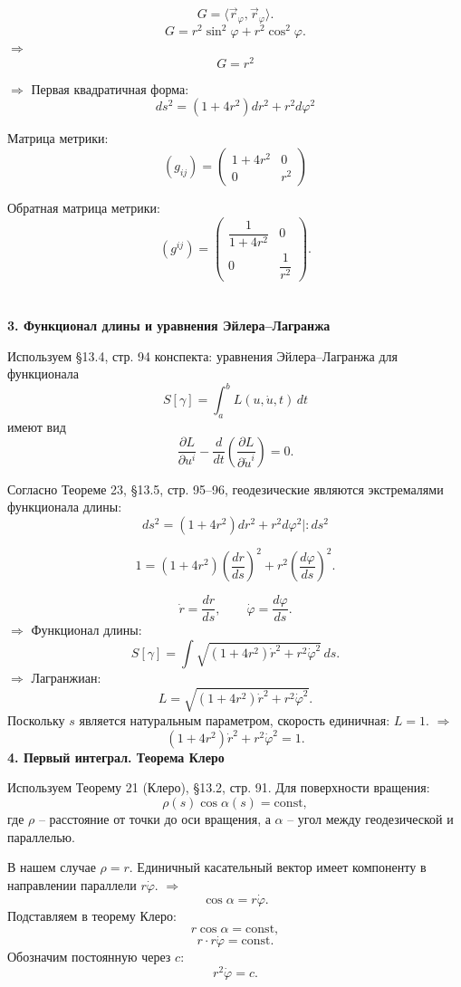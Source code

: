 \documentclass[12pt,a4paper]{article}
\begin{document}
\[
G=\langle\vec r_\varphi,\vec r_\varphi\rangle.
\]
\[
G=r^2\sin^2\varphi+r^2\cos^2\varphi.
\]
\(\Rightarrow\)
\[
\boxed{G=r^2}
\]

\(\Rightarrow\) Первая квадратичная форма:
\[
\boxed{ds^2=(1+4r^2)dr^2+r^2d\varphi^2}
\]

Матрица метрики:
\[
\boxed{(g_{ij})=\begin{pmatrix} 1+4r^2 & 0 \\ 0 & r^2 \end{pmatrix}}
\]

Обратная матрица метрики:
\[
(g^{ij})=\begin{pmatrix} \dfrac{1}{1+4r^2} & 0 \\ 0 & \dfrac{1}{r^2} \end{pmatrix}.
\]\\

\textbf{\\3. Функционал длины и уравнения Эйлера--Лагранжа}

Используем §13.4, стр. 94 конспекта: уравнения Эйлера--Лагранжа для функционала
\[
S[\gamma]=\int_a^b L(u,\dot u,t)\,dt
\]
имеют вид
\[
\boxed{\frac{\partial L}{\partial u^i} - \frac{d}{dt} \left( \frac{\partial L}{\partial\dot u^i} \right)=0.}
\]

Согласно Теореме 23, §13.5, стр. 95--96, геодезические являются экстремалями функционала длины:
\[
ds^2=(1+4r^2)dr^2+r^2d\varphi^2 |: ds^2
\]

\[
1=(1+4r^2)\left(\frac{dr}{ds}\right)^2+r^2\left(\frac{d\varphi}{ds}\right)^2.
\]

\[
\dot r=\frac{dr}{ds},\qquad \dot\varphi=\frac{d\varphi}{ds}.
\]
\(\Rightarrow\) Функционал длины:
\[
S[\gamma]=\int \sqrt{(1+4r^2)\dot r^2+r^2\dot\varphi^2}\,ds.
\]
\(\Rightarrow\) Лагранжиан:
\[
L=\sqrt{(1+4r^2)\dot r^2+r^2\dot\varphi^2}.
\]
Поскольку \(s\) является натуральным параметром, скорость единичная: \(L=1\).
\(\Rightarrow\)\[\boxed{(1+4r^2)\dot r^2+r^2\dot\varphi^2=1.}\]
\newpage
\textbf{4. Первый интеграл. Теорема Клеро}

Используем Теорему 21 (Клеро), §13.2, стр. 91. Для поверхности вращения:
\[
\rho(s)\cos\alpha(s)=\mathrm{const},
\]
где \(\rho\) -- расстояние от точки до оси вращения, а \(\alpha\) -- угол между геодезической и параллелью.

В нашем случае \(\rho=r\). Единичный касательный вектор имеет компоненту в направлении параллели \(r\dot\varphi\).
\(\Rightarrow\)
\[
\cos\alpha=r\dot\varphi.
\]
Подставляем в теорему Клеро:
\[
r\cos\alpha=\mathrm{const},
\]
\[
r\cdot r\dot\varphi=\mathrm{const}.
\]
Обозначим постоянную через \(c\):
\[
\boxed{r^2\dot\varphi=c.}
\]
\end{document}
